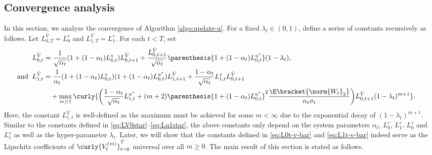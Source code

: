 \documentclass{article}
\begin{document}
\subsection{Convergence analysis}
In this section, we analyze the convergence of Algorithm \ref{algo:update-u}. For a fixed $\lambda_t \in (0, 1)$, define a series of constants recursively as follows. Let $L_{0, T}^{\bar{V}} = L_{0}^r$ and $L_{1, T}^{\bar{V}} = L_{1}^r$. For each $t < T$, set 
\begin{align}
        L_{0,t}^{\bar{V}} &= \frac{1}{\sqrt{\alpha_t}}(1 + (1 - \alpha_t)L_{0, t}^{s})
L_{0, t+1}^{\bar{V}} + \frac{L_{0, t+1}^{\bar{V}}}{\sqrt{\alpha_{t}}}\parenthesis{1 + (1 - \alpha_{t})L_{0,t}^{u^{*}}}(1- \lambda_t), \label{eq:L0t-v-bar}  \\ \text{and} \;\; L_{1,t}^{\bar{V}} & = \frac{1}{\alpha_{t}}(1 + (1 - \alpha_{t})L_{0, t}^s)(1 + (1 - \alpha_{t})L_{0, t}^{u^*})L_{1,t+1}^{\bar{V}} + \frac{1 - \alpha_{t}}{\sqrt{\alpha_{t}}}L_{1,t}^s L_{0, t+1}^{\bar{V}} \nonumber \\ & \quad + \max_{m \geq 1}\curly{\bigg(\frac{1 - \alpha_{t}}{\sqrt{\alpha_{t}}} L_{1, t}^{u^{*}}  + (m+2)\parenthesis{1 + (1 - \alpha_{t})L_{0,t}^{u^{*}}}^{2}\frac{\E\bracket{\norm{W_{t}}_2}}{\alpha_t\sigma_{t}}\bigg)L_{0, t+1}^{\bar{V}}( 1- \lambda_t)^{m+1}}. \label{eq:L1t-v-bar}
\end{align}
Here, the constant $L_{1,t}^{\bar{V}}$ is well-defined as the maximum must be achieved for some $m < \infty$ due to the exponential decay of $(1 - \lambda_t)^{m+1}$. 
Similar to the constants defined in \eqref{eq:LV0star}--\eqref{eq:Lu1star}, the above constants only depend on the system parameters $\alpha_t$, $L_0^r$, $L_1^r$, $L_0^s$ and $L_1^s$ as well as the hyper-parameter $\lambda_t$. Later, we will show that the constants defined in \eqref{eq:L0t-v-bar} and \eqref{eq:L1t-v-bar} indeed serve as the Lipschitz coefficients of $\curly{V_t^{(m)}}_{t=0}^T$ universal over all $m \geq 0$. 
The main result of this section is stated as follows. 
\end{document}
